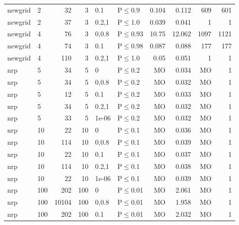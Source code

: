 \begin{longtable}{llrrllrrrr}
 newgrid       & 2        &     	32 &   3 & 0.1   & P$\leq$0.9   & 0.104   & 0.112   & 609     & 601    \\
 newgrid       & 2        &     	37 &   3 & 0.2,1 & P$\leq$1.0   & 0.039   & 0.041   & 1       & 1      \\
 newgrid       & 4        &     	76 &   3 & 0,0.8 & P$\leq$0.93  & 10.75   & 12.062  & 1097    & 1121   \\
 newgrid       & 4        &     	74 &   3 & 0.1   & P$\leq$0.98  & 0.087   & 0.088   & 177     & 177    \\
 newgrid       & 4        &    	110 &   3 & 0.2,1 & P$\leq$1.0   & 0.05    & 0.051   & 1       & 1      \\
 nrp           & 5        &     	34 &   5 & 0     & P$\leq$0.2   & MO      & 0.034   & MO      & 1      \\
 nrp           & 5        &     	34 &   5 & 0,0.8 & P$\leq$0.2   & MO      & 0.032   & MO      & 1      \\
 nrp           & 5        &     	12 &   5 & 0.1   & P$\leq$0.2   & MO      & 0.033   & MO      & 1      \\
 nrp           & 5        &     	34 &   5 & 0.2,1 & P$\leq$0.2   & MO      & 0.032   & MO      & 1      \\
 nrp           & 5        &     	33 &   5 & 1e-06 & P$\leq$0.2   & MO      & 0.032   & MO      & 1      \\
 nrp           & 10       &     	22 &  10 & 0     & P$\leq$0.1   & MO      & 0.036   & MO      & 1      \\
 nrp           & 10       &    	114 &  10 & 0,0.8 & P$\leq$0.1   & MO      & 0.039   & MO      & 1      \\
 nrp           & 10       &     	22 &  10 & 0.1   & P$\leq$0.1   & MO      & 0.037   & MO      & 1      \\
 nrp           & 10       &    	114 &  10 & 0.2,1 & P$\leq$0.1   & MO      & 0.038   & MO      & 1      \\
 nrp           & 10       &     	22 &  10 & 1e-06 & P$\leq$0.1   & MO      & 0.039   & MO      & 1      \\
 nrp           & 100      &    	202 & 100 & 0     & P$\leq$0.01  & MO      & 2.061   & MO      & 1      \\
 nrp           & 100      &  	10104 & 100 & 0,0.8 & P$\leq$0.01  & MO      & 1.958   & MO      & 1      \\
 nrp           & 100      &    	202 & 100 & 0.1   & P$\leq$0.01  & MO      & 2.032   & MO      & 1      \\

\end{longtable}
